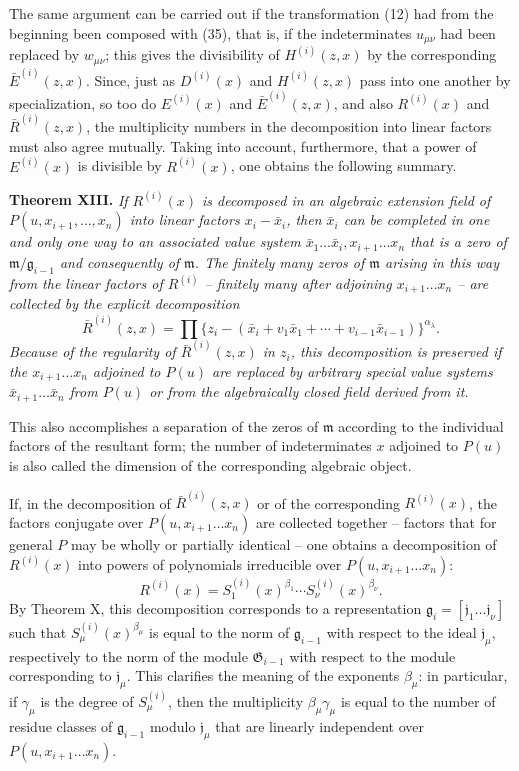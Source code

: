 \documentclass[11pt]{article}
\providecommand{\Gmod}{\mathfrak G}
\providecommand{\mideal}{\mathfrak m}
\providecommand{\gideal}{\mathfrak g}
\providecommand{\jideal}{\mathfrak j}
\begin{document}
The same argument can be carried out if the transformation (12) had from the beginning been composed with (35), that is, if the indeterminates $u_{\mu\nu}$ had been replaced by $w_{\mu\nu}$; this gives the divisibility of $H^{(i)}(z,x)$ by the corresponding $\bar E^{(i)}(z,x)$. Since, just as $D^{(i)}(x)$ and $H^{(i)}(z,x)$ pass into one another by specialization, so too do $E^{(i)}(x)$ and $\bar E^{(i)}(z,x)$, and also $R^{(i)}(x)$ and $\bar R^{(i)}(z,x)$, the multiplicity numbers in the decomposition into linear factors must also agree mutually. Taking into account, furthermore, that a power of $E^{(i)}(x)$ is divisible by $R^{(i)}(x)$, one obtains the following summary.

\medskip
\noindent\textbf{Theorem XIII.} \emph{If $R^{(i)}(x)$ is decomposed in an algebraic extension field of $P(u,x_{i+1},
\ldots,x_n)$ into linear factors $x_i-\bar x_i$, then $\bar x_i$ can be completed in one and only one way to an associated value system $\bar x_1\ldots\bar x_i,x_{i+1}\ldots x_n$ that is a zero of $\mideal/\gideal_{i-1}$ and consequently of $\mideal$. The finitely many zeros of $\mideal$ arising in this way from the linear factors of $R^{(i)}$ -- finitely many after adjoining $x_{i+1}\ldots x_n$ -- are collected by the explicit decomposition}
\begin{equation}
 \bar R^{(i)}(z,x)=\prod\{z_i-(\bar x_i+v_1\bar x_1+\cdots+v_{i-1}\bar x_{i-1})\}^{\alpha_\lambda}.
\tag{36}
\end{equation}
\emph{Because of the regularity of $\bar R^{(i)}(z,x)$ in $z_i$, this decomposition is preserved if the $x_{i+1}\ldots x_n$ adjoined to $P(u)$ are replaced by arbitrary special value systems $\bar x_{i+1}\ldots\bar x_n$ from $P(u)$ or from the algebraically closed field derived from it.}

This also accomplishes a separation of the zeros of $\mideal$ according to the individual factors of the resultant form; the number of indeterminates $x$ adjoined to $P(u)$ is also called the dimension of the corresponding algebraic object.

If, in the decomposition of $\bar R^{(i)}(z,x)$ or of the corresponding $R^{(i)}(x)$, the factors conjugate over $P(u,x_{i+1}\ldots x_n)$ are collected together -- factors that for general $P$ may be wholly or partially identical -- one obtains a decomposition of $R^{(i)}(x)$ into powers of polynomials irreducible over $P(u,x_{i+1}\ldots x_n)$:
\[
 R^{(i)}(x)=S^{(i)}_1(x)^{\beta_1}\cdots S^{(i)}_\nu(x)^{\beta_\nu}.
\]
By Theorem X, this decomposition corresponds to a representation $\gideal_i=[\jideal_1\ldots\jideal_\nu]$ such that $S^{(i)}_\mu(x)^{\beta_\mu}$ is equal to the norm of $\gideal_{i-1}$ with respect to the ideal $\jideal_\mu$, respectively to the norm of the module $\Gmod_{i-1}$ with respect to the module corresponding to $\jideal_\mu$. This clarifies the meaning of the exponents $\beta_\mu$: in particular, if $\gamma_\mu$ is the degree of $S^{(i)}_\mu$, then the multiplicity $\beta_\mu\gamma_\mu$ is equal to the number of residue classes of $\gideal_{i-1}$ modulo $\jideal_\mu$ that are linearly independent over $P(u,x_{i+1}\ldots x_n)$.
\end{document}

